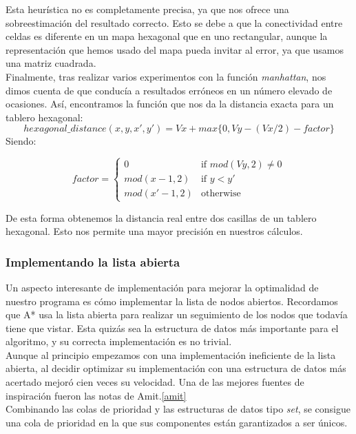 \documentclass[a4paper,12pt,oneside]{book}
\begin{document}
Esta heurística no es completamente precisa, ya que  nos ofrece una
sobreestimación del resultado correcto. Esto se debe a que la
conectividad entre celdas es diferente en un mapa hexagonal que en
uno rectangular, aunque la representación que hemos usado del mapa
pueda invitar al error, ya que usamos una matriz cuadrada.\\

Finalmente, tras realizar varios experimentos con la función {\it
  manhattan}, nos dimos cuenta de que conducía a resultados erróneos
en un número elevado de ocasiones. Así, encontramos la función que nos
da la distancia exacta para un tablero hexagonal:
$$ hexagonal\_distance(x,y, x',y') = Vx + max \{0, Vy- (Vx/2) -
factor\}  $$
Siendo:

$$ factor = \left \{ \begin{matrix} 0 & \mbox{if }mod(Vy,2) \ne 0 
    \\ mod(x-1,2) & \mbox{if } y < y'
    \\ mod(x'-1,2) & \mbox{otherwise } \end{matrix} \right. $$

De esta forma obtenemos la distancia real entre dos casillas de un tablero
hexagonal. Esto nos permite una mayor precisión en nuestros cálculos.

\subsubsection{Implementando la lista abierta}

Un aspecto interesante de implementación para mejorar la optimalidad
de nuestro programa es cómo implementar la lista de nodos
abiertos. Recordamos que A* usa la lista abierta para realizar un
seguimiento de los nodos que todavía tiene que vistar. Esta quizás sea
la estructura de datos más importante para el algoritmo, y su correcta
implementación es no trivial.\\

Aunque al principio empezamos con una implementación ineficiente de la
lista abierta, al decidir optimizar su implementación con una
estructura de datos más acertado mejoró cien veces su velocidad. Una
de las mejores fuentes de inspiración fueron las notas de
Amit.\ref{amit} \\

Combinando las colas de prioridad y las estructuras de datos tipo {\it
  set}, se consigue una cola de prioridad en la que sus componentes
están garantizados a ser únicos. \\
\end{document}
